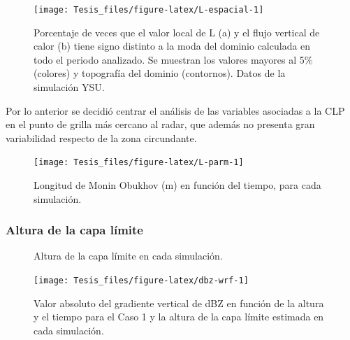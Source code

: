 \documentclass[12pt,spanish,oneside]{book}
\begin{document}
\begin{figure}

{\centering \texttt{[image: Tesis\_files/figure-latex/L-espacial-1]} 

}

\caption{Porcentaje de veces que el valor local de L (a) y el flujo vertical de calor (b) tiene signo distinto a la moda del dominio calculada en todo el periodo analizado. Se muestran los valores mayores al 5\% (colores) y topografía del dominio (contornos). Datos de la simulación YSU. \label{L-esp}}\label{fig:L-espacial}
\end{figure}

Por lo anterior se decidió centrar el análisis de las variables
asociadas a la CLP en el punto de grilla más cercano al radar, que
además no presenta gran variabilidad respecto de la zona circundante.

\begin{figure}

{\centering \texttt{[image: Tesis\_files/figure-latex/L-parm-1]} 

}

\caption{Longitud de Monin Obukhov (m) en función del tiempo, para cada simulación. \label{L-param}}\label{fig:L-parm}
\end{figure}

\subsubsection{Altura de la capa
límite}\label{altura-de-la-capa-limite-1}

\begin{figure}

{\centering {}\newline{}

}

\caption{Altura de la capa límite en cada simulación. \label{pblh-wrf}}\label{fig:pblh-wrf}
\end{figure}

\begin{figure}

{\centering \texttt{[image: Tesis\_files/figure-latex/dbz-wrf-1]} 

}

\caption{Valor absoluto del gradiente vertical de dBZ en función de la altura y el tiempo para el Caso 1 y la altura de la capa límite estimada en cada simulación. \label{pblh-dbz}}\label{fig:dbz-wrf}
\end{figure}
\end{document}
